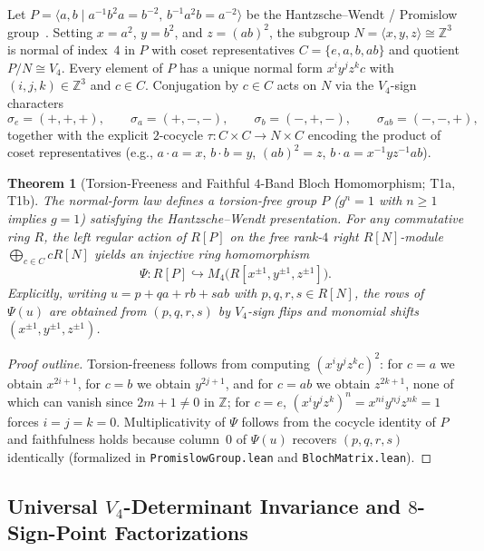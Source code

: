 \documentclass[11pt,reqno]{amsart}
\newtheorem{theorem}{Theorem}[section]
\theoremstyle{definition}
\newcommand{\Z}{\mathbb{Z}}
\begin{document}
Let $P = \langle a, b \mid a^{-1} b^2 a = b^{-2},\, b^{-1} a^2 b = a^{-2} \rangle$ be the
Hantzsche--Wendt / Promislow group~\cite{hantzsche1935dreidimensionale,promislow1988simple}.
Setting $x = a^2$, $y = b^2$, and $z = (ab)^2$, the subgroup $N = \langle x, y, z \rangle \cong \Z^3$
is normal of index~$4$ in $P$ with coset representatives $C = \{e, a, b, ab\}$ and quotient
$P/N \cong V_4$. Every element of $P$ has a unique normal form $x^i y^j z^k c$ with
$(i,j,k) \in \Z^3$ and $c \in C$. Conjugation by $c \in C$ acts on $N$ via the $V_4$-sign
characters
\[
  \sigma_e = (+,+,+), \qquad \sigma_a = (+,-,-), \qquad \sigma_b = (-,+,-), \qquad \sigma_{ab} = (-,-,+),
\]
together with the explicit $2$-cocycle $\tau : C \times C \to N \times C$ encoding the product of
coset representatives (e.g., $a \cdot a = x$, $b \cdot b = y$, $(ab)^2 = z$, $b \cdot a = x^{-1} y z^{-1} ab$).

\begin{theorem}[Torsion-Freeness and Faithful $4$-Band Bloch Homomorphism; \textsf{T1a}, \textsf{T1b}]
\label{thm:t1ab}
The normal-form law defines a torsion-free group $P$ ($g^n = 1$ with $n \ge 1$ implies $g = 1$)
satisfying the Hantzsche--Wendt presentation. For any commutative ring $R$, the left regular
action of $R[P]$ on the free rank-$4$ right $R[N]$-module $\bigoplus_{c \in C} c R[N]$ yields an
injective ring homomorphism
\[
  \Psi : R[P] \hookrightarrow M_4\bigl(R[x^{\pm 1}, y^{\pm 1}, z^{\pm 1}]\bigr).
\]
Explicitly, writing $u = p + q a + r b + s ab$ with $p,q,r,s \in R[N]$, the rows of $\Psi(u)$
are obtained from $(p,q,r,s)$ by $V_4$-sign flips and monomial shifts $(x^{\pm 1}, y^{\pm 1}, z^{\pm 1})$.
\end{theorem}

\begin{proof}[Proof outline]
Torsion-freeness follows from computing $(x^i y^j z^k c)^2$: for $c=a$ we obtain $x^{2i+1}$, for
$c=b$ we obtain $y^{2j+1}$, and for $c=ab$ we obtain $z^{2k+1}$, none of which can vanish since
$2m+1 \neq 0$ in $\Z$; for $c=e$, $(x^i y^j z^k)^n = x^{ni} y^{nj} z^{nk} = 1$ forces $i=j=k=0$.
Multiplicativity of $\Psi$ follows from the cocycle identity of $P$ and faithfulness holds because
column~$0$ of $\Psi(u)$ recovers $(p, q, r, s)$ identically (formalized in \texttt{PromislowGroup.lean}
and \texttt{BlochMatrix.lean}).
\end{proof}

\subsection{Universal $V_4$-Determinant Invariance and $8$-Sign-Point Factorizations}
\end{document}

